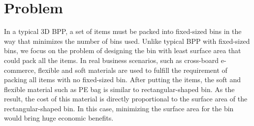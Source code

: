 \section{Problem}
\label{sec:problem}

In a typical 3D BPP, a set of items must be packed into fixed-sized bins in the way that minimizes the number of bins used. Unlike typical BPP with fixed-sized bins, we focus on the problem of designing the bin with least surface area that could pack all the items. In real business scenarios, such as cross-board e-commerce, flexible and soft materials are used to fulfill the requirement of  packing all items with no fixed-sized bin. %
After putting the items, the soft and flexible material such as PE bag is similar to rectangular-shaped bin. As the result, the cost of this material is directly proportional to the surface area of the rectangular-shaped bin. In this case, minimizing the surface area for the bin would bring huge economic benefits.


